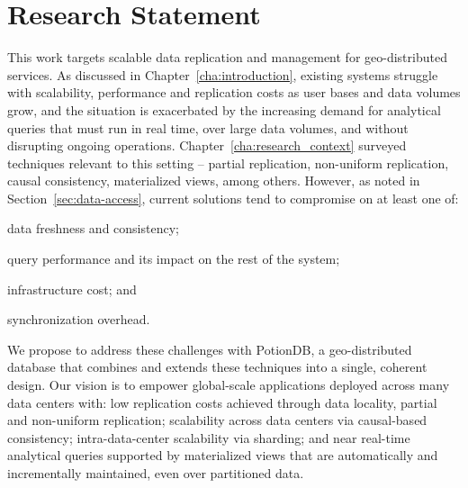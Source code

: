 
%

\chapter{Research Statement}
\label{cha:research_statement}


This work targets scalable data replication and management for geo-distributed services.
As discussed in Chapter~\ref{cha:introduction}, existing systems struggle with scalability, performance and replication costs as user bases and data volumes grow, and the situation is exacerbated by the increasing demand for analytical queries that must run in real time, over large data volumes, and without disrupting ongoing operations.
Chapter~\ref{cha:research_context} surveyed techniques relevant to this setting -- partial replication, non-uniform replication, causal consistency, materialized views, among others.
However, as noted in Section~\ref{sec:data-access}, current solutions tend to compromise on at least one of:
\begin{enumerate*}[label=(\roman*)]
\item data freshness and consistency;
\item query performance and its impact on the rest of the system;
\item infrastructure cost; and
\item synchronization overhead.
\end{enumerate*}

We propose to address these challenges with PotionDB, a geo-distributed database that combines and extends these techniques into a single, coherent design.
Our vision is to empower global-scale applications deployed across many data centers with: low replication costs achieved through data locality, partial and non-uniform replication; scalability across data centers via causal-based consistency; intra-data-center scalability via sharding; and near real-time analytical queries supported by materialized views that are automatically and incrementally maintained, even over partitioned data.

